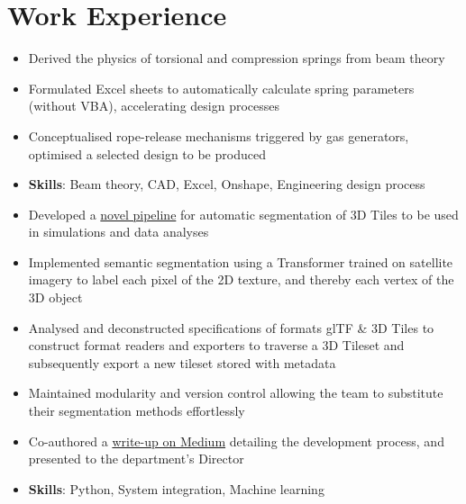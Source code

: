 \documentclass{cv}
\begin{document}
\section{Work Experience}
\begin{subsections}
    \subtitle{MathWorks \hfill Cambridge, United Kingdom}

    \subtitle{Guided Systems, DSO National Laboratories \hfill Singapore}
    \begin{itemize}
        \item Derived the physics of torsional and compression springs from beam theory
        \item Formulated Excel sheets to automatically calculate spring parameters (without VBA), accelerating design processes
        \item Conceptualised rope-release mechanisms triggered by gas generators, optimised a selected design to be produced
        \item \textbf{Skills}: Beam theory, CAD, Excel, Onshape, Engineering design process
    \end{itemize}

    \subtitle{Simulation \& Training Systems Hub, Defence Science and Technology Agency \hfill Singapore}
    \begin{itemize}
        \item Developed a \href{https://github.com/thedylone/tile-segmentation-pipeline}{novel pipeline} for automatic segmentation of 3D Tiles to be used in simulations and data analyses
        \item Implemented semantic segmentation using a Transformer trained on satellite imagery to label each pixel of the 2D texture, and thereby each vertex of the 3D object
        \item Analysed and deconstructed specifications of formats glTF \& 3D Tiles to construct format readers and exporters to traverse a 3D Tileset and subsequently export a new tileset stored with metadata
        \item Maintained modularity and version control allowing the team to substitute their segmentation methods effortlessly
        \item Co-authored a \href{https://medium.com/d-classified/segmentation-pipeline-for-3d-tiles-1303fcb5e6be}{write-up on Medium} detailing the development process, and presented to the department's Director
        \item \textbf{Skills}: Python, System integration, Machine learning
    \end{itemize}


\end{subsections}
\end{document}
